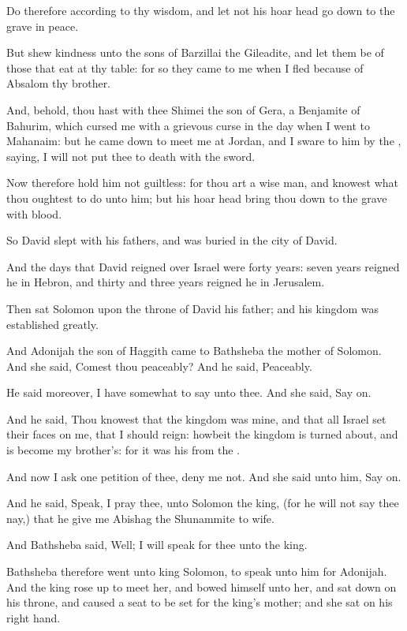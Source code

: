 \verse Do therefore according to thy wisdom, and let not his hoar head go down to the grave in peace.

\verse But shew kindness unto the sons of Barzillai the Gileadite, and let them be of those that eat at thy table: for so they came to me when I fled because of Absalom thy brother.

\verse And, behold, thou hast with thee Shimei the son of Gera, a Benjamite of Bahurim, which cursed me with a grievous curse in the day when I went to Mahanaim: but he came down to meet me at Jordan, and I sware to him by the \LORD, saying, I will not put thee to death with the sword.

\verse Now therefore hold him not guiltless: for thou art a wise man, and knowest what thou oughtest to do unto him; but his hoar head bring thou down to the grave with blood.

\verse So David slept with his fathers, and was buried in the city of David.

\verse And the days that David reigned over Israel were forty years: seven years reigned he in Hebron, and thirty and three years reigned he in Jerusalem.

\verse Then sat Solomon upon the throne of David his father; and his kingdom was established greatly.

\verse And Adonijah the son of Haggith came to Bathsheba the mother of Solomon. And she said, Comest thou peaceably? And he said, Peaceably.

\verse He said moreover, I have somewhat to say unto thee. And she said, Say on.

\verse And he said, Thou knowest that the kingdom was mine, and that all Israel set their faces on me, that I should reign: howbeit the kingdom is turned about, and is become my brother's: for it was his from the \LORD.

\verse And now I ask one petition of thee, deny me not. And she said unto him, Say on.

\verse And he said, Speak, I pray thee, unto Solomon the king, (for he will not say thee nay,) that he give me Abishag the Shunammite to wife.

\verse And Bathsheba said, Well; I will speak for thee unto the king.

\verse Bathsheba therefore went unto king Solomon, to speak unto him for Adonijah. And the king rose up to meet her, and bowed himself unto her, and sat down on his throne, and caused a seat to be set for the king's mother; and she sat on his right hand.

